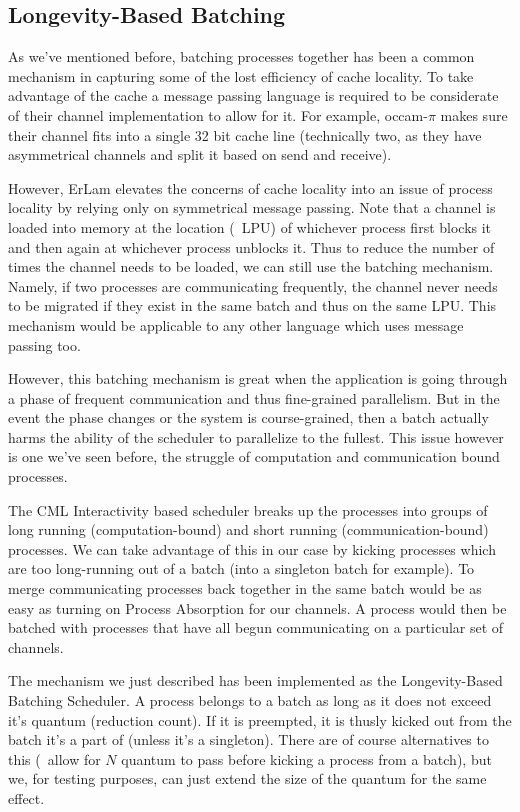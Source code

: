 \subsection{Longevity-Based Batching}\label{sec:longevity based batching}

As we've mentioned before, batching processes together has been a common 
mechanism in capturing some of the lost efficiency of cache locality. To take
advantage of the cache a message passing language is required to be considerate 
of their channel implementation to allow for it. For example, occam-$\pi$ makes sure
their channel fits into a single 32 bit cache line (technically two, as they
have asymmetrical channels and split it based on send and receive).

However, ErLam elevates the concerns of cache locality into an issue of process 
locality by relying only on symmetrical message passing. Note that 
a channel is loaded into memory at the location (\ie~LPU) of whichever process 
first blocks it and then again at whichever process unblocks it. Thus to reduce
the number of times the channel needs to be loaded, we can still use the 
batching mechanism. Namely, if two processes are communicating frequently, the
channel never needs to be migrated if they exist in the same batch and thus on the
same LPU. This mechanism would be applicable to any other language which uses 
message passing too.

However, this batching mechanism is great when the application is going through
a phase of frequent communication and thus fine-grained parallelism. But in the
event the phase changes or the system is course-grained, then a batch actually
harms the ability of the scheduler to parallelize to the fullest. This issue 
however is one we've seen before, the struggle of computation and communication
bound processes.

The CML Interactivity based scheduler breaks up the processes into groups of
long running (computation-bound) and short running (communication-bound)
processes. We can take advantage of this in our case by kicking processes which
are too long-running out of a batch (into a singleton batch for example). To 
merge communicating processes back together in the same batch would be as easy
as turning on Process Absorption for our channels. A process would then be
batched with processes that have all begun communicating on a particular set
of channels.

The mechanism we just described has been implemented as the Longevity-Based
Batching Scheduler. A process belongs to a batch as long as it does not exceed
it's quantum (reduction count). If it is preempted, it is thusly kicked out 
from the batch it's a part of (unless it's a singleton). There are of course
alternatives to this (\eg~allow for $N$ quantum to pass before kicking a 
process from a batch), but we, for testing purposes, can just extend the size
of the quantum for the same effect.

